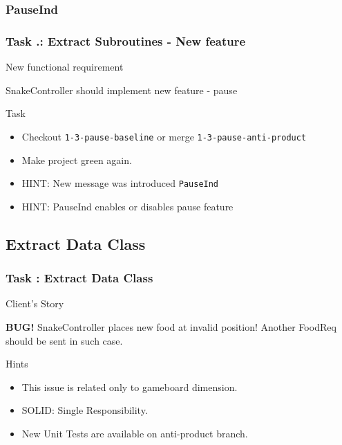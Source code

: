\documentclass[english]{beamer}
\newenvironment{narrowblock}[1]{%
\begin{center}
\begin{minipage}{10.5cm}
\begin{block}{#1}
}{%
\end{block}
\end{minipage}
\end{center}
}
\begin{document}
\subsubsection{PauseInd}

\begin{frame}
\frametitle{Task \thesubsection.\thesubsubsection: Extract Subroutines - New feature}

\begin{narrowblock}{New functional requirement}
SnakeController should implement new feature - pause
\end{narrowblock}

\pause
\begin{narrowblock}{Task}
\begin{itemize}[<+->]
 \item Checkout \texttt{1-3-pause-baseline} or merge \texttt{1-3-pause-anti-product}
 \item Make project green again.
 \item HINT: New message was introduced \texttt{PauseInd}
 \item HINT: PauseInd enables or disables pause feature
\end{itemize}
\end{narrowblock}
\end{frame}

\subsection{Extract Data Class}

\begin{frame}
\frametitle{Task \thesubsection: Extract Data Class}

\begin{narrowblock}{Client's Story}
\textbf{BUG!} SnakeController places new food at invalid position! Another FoodReq should be sent in such case.
\end{narrowblock}

\pause
\begin{narrowblock}{Hints}
\begin{itemize}[<+->]
\item This issue is related only to gameboard dimension.
\item SOLID: Single Responsibility.
\item New Unit Tests are available on anti-product branch.
\end{itemize}
\end{narrowblock}
\end{frame}
\end{document}
